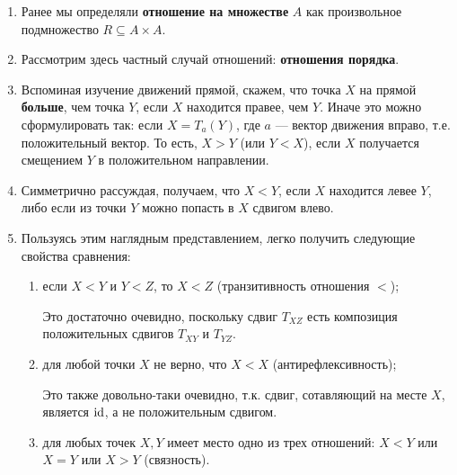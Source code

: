 \begin{enumerate}
\item Ранее мы определяли \textbf{отношение на множестве} $A$ как произвольное подмножество $R\subseteq A\times A$.
\item Рассмотрим здесь частный случай отношений: \textbf{отношения порядка}.
\item Вспоминая изучение движений прямой, скажем, что точка $X$ на прямой \textbf{больше}, чем точка $Y$, если $X$ находится правее, чем $Y$. Иначе это можно сформулировать так: если $X=T_a(Y)$, где $a$ --- вектор движения вправо, т.е. положительный вектор. То есть, $X>Y$ (или $Y<X$), если $X$ получается смещением $Y$ в положительном направлении.
\item Симметрично рассуждая, получаем, что $X<Y$, если $X$ находится левее $Y$, либо если из точки $Y$ можно попасть в $X$ сдвигом влево.
\item Пользуясь этим наглядным представлением, легко получить следующие свойства сравнения:
\begin{enumerate}[Rel1]
\item если $X<Y$ и $Y<Z$, то $X<Z$ (транзитивность отношения $<$);

Это достаточно очевидно, поскольку сдвиг $T_{XZ}$ есть композиция положительных сдвигов $T_{XY}$ и $T_{YZ}$.
\item для любой точки $X$ не верно, что $X<X$ (антирефлексивность);

Это также довольно-таки очевидно, т.к. сдвиг, сотавляющий на месте $X$, является $\mathrm{id}$, а не положительным сдвигом.
\item для любых точек $X,Y$ имеет место одно из трех отношений: $X<Y$ или $X=Y$ или $X>Y$ (связность).


\end{enumerate}
\end{enumerate}
